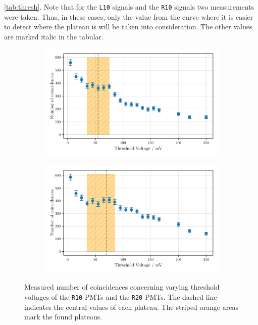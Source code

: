 \autoref{tab:thresh}.
Note that for the \texttt{L10} signals and the \texttt{R10} signals two measurements 
were taken. Thus, in these cases, only the value from the curve where it is easier to detect
where the plateau is will be taken into consideration.
The other values are marked italic in the tabular.
\begin{figure}
    \centering
    \begin{subfigure}[b]{0.48\textwidth}
    \includegraphics[width=\textwidth]{plots/threshR20.pdf}
\end{subfigure}\hfill
\begin{subfigure}[b]{0.48\textwidth}
    \includegraphics[width=\textwidth]{plots/threshR10.pdf}
\end{subfigure}
\caption{Measured number of coincidences concerning varying threshold voltages
of the \texttt{R10} PMTs and the \texttt{R20} PMTs.
The dashed line indicates the central values of each plateau. The striped orange areas mark the found plateaus.}
\label{fig:threshR10R20}
\end{figure}
